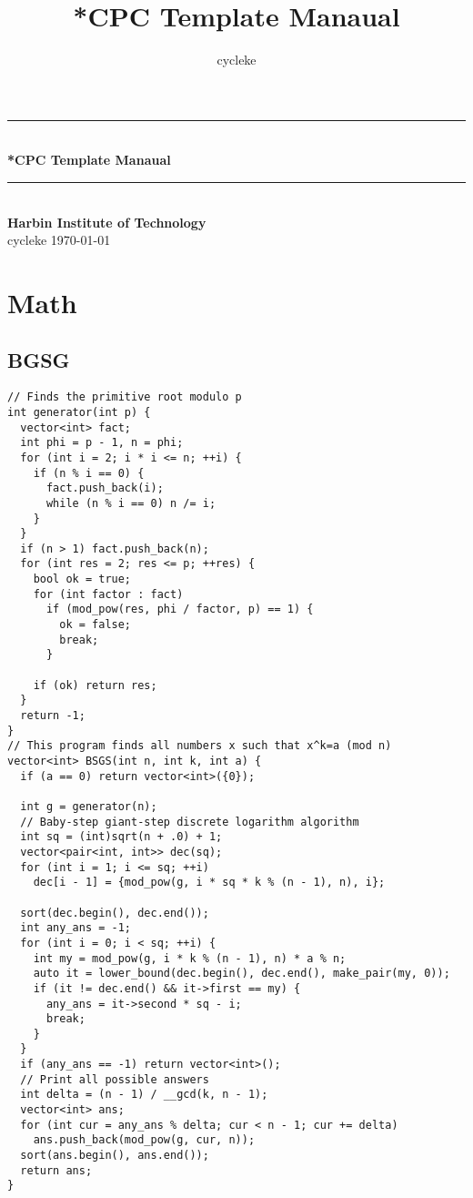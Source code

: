\documentclass[twoside]{article}
\title{*CPC Template Manaual}
\author{cycleke}
\newcommand{\HRule}{\rule{\linewidth}{0.5mm}}
\begin{document}
\small
\begin{titlepage}
  \begin{center}
    \HRule \\ [1cm]
    \textbf{\Huge{*CPC Template Manaual}} \\ [0.5cm]
    \HRule \\ [4cm]
    \textbf{\Huge{Harbin Institute of Technology}} \\ [1cm]
    \LARGE{cycleke}
    \vfill
    \Large{\today}
  \end{center}
  \clearpage
\end{titlepage}
\tableofcontents\clearpage
\pagestyle{fancy}
\lfoot{}
\cfoot{\thepage}\rfoot{}
\setcounter{section}{0}
\setcounter{page}{1}
\clearpage

\section{Math}

\subsection{BGSG}
\begin{lstlisting}
// Finds the primitive root modulo p
int generator(int p) {
  vector<int> fact;
  int phi = p - 1, n = phi;
  for (int i = 2; i * i <= n; ++i) {
    if (n % i == 0) {
      fact.push_back(i);
      while (n % i == 0) n /= i;
    }
  }
  if (n > 1) fact.push_back(n);
  for (int res = 2; res <= p; ++res) {
    bool ok = true;
    for (int factor : fact)
      if (mod_pow(res, phi / factor, p) == 1) {
        ok = false;
        break;
      }

    if (ok) return res;
  }
  return -1;
}
// This program finds all numbers x such that x^k=a (mod n)
vector<int> BSGS(int n, int k, int a) {
  if (a == 0) return vector<int>({0});

  int g = generator(n);
  // Baby-step giant-step discrete logarithm algorithm
  int sq = (int)sqrt(n + .0) + 1;
  vector<pair<int, int>> dec(sq);
  for (int i = 1; i <= sq; ++i)
    dec[i - 1] = {mod_pow(g, i * sq * k % (n - 1), n), i};

  sort(dec.begin(), dec.end());
  int any_ans = -1;
  for (int i = 0; i < sq; ++i) {
    int my = mod_pow(g, i * k % (n - 1), n) * a % n;
    auto it = lower_bound(dec.begin(), dec.end(), make_pair(my, 0));
    if (it != dec.end() && it->first == my) {
      any_ans = it->second * sq - i;
      break;
    }
  }
  if (any_ans == -1) return vector<int>();
  // Print all possible answers
  int delta = (n - 1) / __gcd(k, n - 1);
  vector<int> ans;
  for (int cur = any_ans % delta; cur < n - 1; cur += delta)
    ans.push_back(mod_pow(g, cur, n));
  sort(ans.begin(), ans.end());
  return ans;
}

\end{lstlisting}
\end{document}
